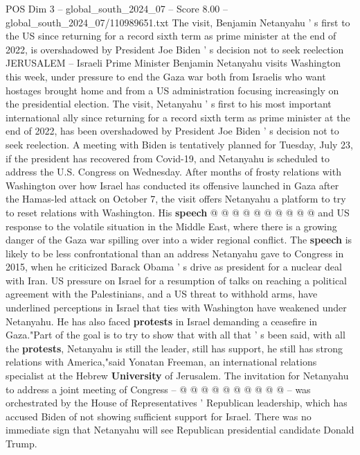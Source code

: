 \begin{textsample}{POS Dim 3 – global\_south\_2024\_07 – Score 8.00 – global\_south\_2024\_07/110989651.txt}  \label{ex:f3_pos_316}
The visit, Benjamin Netanyahu ' s first to the US since returning for a record sixth term as prime minister at the end of 2022, is overshadowed by President Joe Biden ' s decision not to seek reelection JERUSALEM -- Israeli Prime Minister Benjamin Netanyahu visits Washington this week, under pressure to end the Gaza war both from Israelis who want hostages brought home and from a US administration focusing increasingly on the presidential election.
The visit, Netanyahu ' s first to his most important international ally since returning for a record sixth term as prime minister at the end of 2022, has been overshadowed by President Joe Biden ' s decision not to seek reelection.
A meeting with Biden is tentatively planned for Tuesday, July 23, if the president has recovered from Covid-19, and Netanyahu is scheduled to address the U.S.
Congress on Wednesday.
After months of frosty relations with Washington over how Israel has conducted its offensive launched in Gaza after the Hamas-led attack on October 7, the visit offers Netanyahu a platform to try to reset relations with Washington.
His \textbf{speech} @ @ @ @ @ @ @ @ @ @ and US response to the volatile situation in the Middle East, where there is a growing danger of the Gaza war spilling over into a wider regional conflict.
The \textbf{speech} is likely to be less confrontational than an address Netanyahu gave to Congress in 2015, when he criticized Barack Obama ' s drive as president for a nuclear deal with Iran.
US pressure on Israel for a resumption of talks on reaching a political agreement with the Palestinians, and a US threat to withhold arms, have underlined perceptions in Israel that ties with Washington have weakened under Netanyahu.
He has also faced \textbf{protests} in Israel demanding a ceasefire in Gaza."Part of the goal is to try to show that with all that ' s been said, with all the \textbf{protests}, Netanyahu is still the leader, still has support, he still has strong relations with America,"said Yonatan Freeman, an international relations specialist at the Hebrew \textbf{University} of Jerusalem.
The invitation for Netanyahu to address a joint meeting of Congress -- @ @ @ @ @ @ @ @ @ @ -- was orchestrated by the House of Representatives ' Republican leadership, which has accused Biden of not showing sufficient support for Israel.
There was no immediate sign that Netanyahu will see Republican presidential candidate Donald Trump.

\end{textsample}
